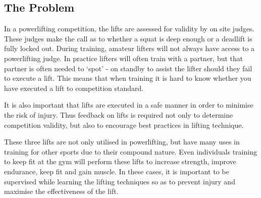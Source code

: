 \subsection{The Problem}

In a powerlifting competition, the lifts are assessed for validity by on site judges. These judges make the call as to whether a squat is deep enough or a deadlift is fully locked out. During training, amateur lifters will not always have access to a powerlifting judge. In practice lifters will often train with a partner, but that partner is often needed to ‘spot’ - on standby to assist the lifter should they fail to execute a lift. This means that when training it is hard to know whether you have executed a lift to competition standard.

It is also important that lifts are executed in a safe manner in order to minimise the risk of injury. Thus feedback on lifts is required not only to determine competition validity, but also to encourage best practices in lifting technique.

These three lifts are not only utilised in powerlifting, but have many uses in training for other sports due to their compound nature. Even individuals training to keep fit at the gym will perform these lifts to increase strength, improve endurance, keep fit and gain muscle. In these cases, it is important to be supervised while learning the lifting techniques so as to prevent injury and maximise the effectiveness of the lift.
